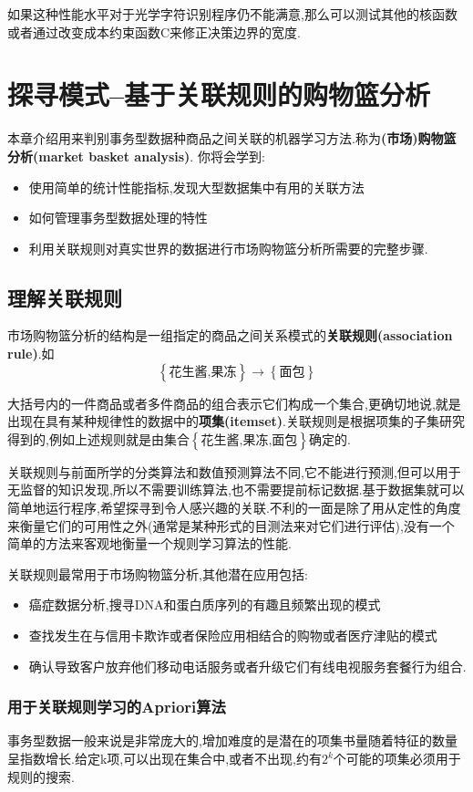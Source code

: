 \documentclass[11pt,a4paper,oneside]{book}
\begin{document}
如果这种性能水平对于光学字符识别程序仍不能满意,那么可以测试其他的核函数或者通过改变成本约束函数C来修正决策边界的宽度.

\chapter{探寻模式--基于关联规则的购物篮分析}
本章介绍用来判别事务型数据种商品之间关联的机器学习方法.称为\textbf{(市场)购物篮分析(market basket analysis)}.
你将会学到:
\begin{itemize}
	\item 使用简单的统计性能指标,发现大型数据集中有用的关联方法
	\item 如何管理事务型数据处理的特性
	\item 利用关联规则对真实世界的数据进行市场购物篮分析所需要的完整步骤.
\end{itemize}

\section{理解关联规则}
市场购物篮分析的结构是一组指定的商品之间关系模式的\textbf{关联规则(association rule)}.如$$ \left\lbrace \mbox{花生酱,果冻}\right\rbrace \rightarrow \left\lbrace \mbox{面包}\right\rbrace  $$

大括号内的一件商品或者多件商品的组合表示它们构成一个集合,更确切地说,就是出现在具有某种规律性的数据中的\textbf{项集(itemset)}.关联规则是根据项集的子集研究得到的,例如上述规则就是由集合$ \left\lbrace \mbox{花生酱,果冻,面包}\right\rbrace  $确定的.

关联规则与前面所学的分类算法和数值预测算法不同,它不能进行预测,但可以用于无监督的知识发现,所以不需要训练算法,也不需要提前标记数据.基于数据集就可以简单地运行程序,希望探寻到令人感兴趣的关联.不利的一面是除了用从定性的角度来衡量它们的可用性之外(通常是某种形式的目测法来对它们进行评估),没有一个简单的方法来客观地衡量一个规则学习算法的性能.

关联规则最常用于市场购物篮分析,其他潜在应用包括:
\begin{itemize}
	\item 癌症数据分析,搜寻DNA和蛋白质序列的有趣且频繁出现的模式
	\item 查找发生在与信用卡欺诈或者保险应用相结合的购物或者医疗津贴的模式
	\item 确认导致客户放弃他们移动电话服务或者升级它们有线电视服务套餐行为组合.
\end{itemize}

\subsection{用于关联规则学习的Apriori算法}
事务型数据一般来说是非常庞大的,增加难度的是潜在的项集书量随着特征的数量呈指数增长.给定k项,可以出现在集合中,或者不出现,约有$ 2^k $个可能的项集必须用于规则的搜索.
\end{document}
